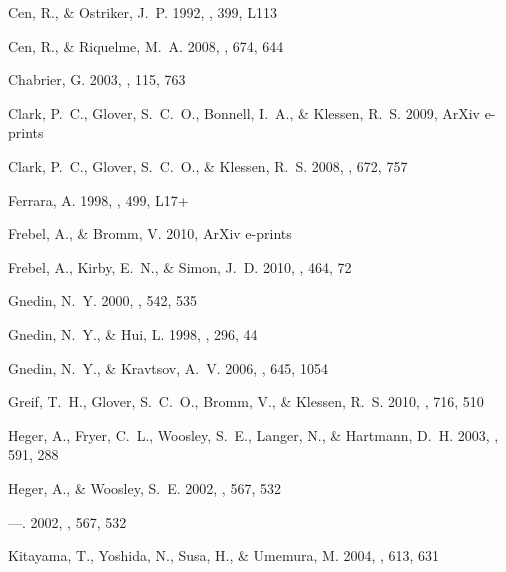 \documentclass[12pt,preprint]{aastex}
\begin{document}
\begin{thebibliography}{50}
{Cen}, R., \& {Ostriker}, J.~P. 1992, \apjl, 399, L113

{Cen}, R., \& {Riquelme}, M.~A. 2008, \apj, 674, 644

{Chabrier}, G. 2003, \pasp, 115, 763

{Clark}, P.~C., {Glover}, S.~C.~O., {Bonnell}, I.~A., \& {Klessen}, R.~S. 2009,
  ArXiv e-prints

{Clark}, P.~C., {Glover}, S.~C.~O., \& {Klessen}, R.~S. 2008, \apj, 672, 757

{Ferrara}, A. 1998, \apjl, 499, L17+

{Frebel}, A., \& {Bromm}, V. 2010, ArXiv e-prints

{Frebel}, A., {Kirby}, E.~N., \& {Simon}, J.~D. 2010, \nat, 464, 72

{Gnedin}, N.~Y. 2000, \apj, 542, 535

{Gnedin}, N.~Y., \& {Hui}, L. 1998, \mnras, 296, 44

{Gnedin}, N.~Y., \& {Kravtsov}, A.~V. 2006, \apj, 645, 1054

{Greif}, T.~H., {Glover}, S.~C.~O., {Bromm}, V., \& {Klessen}, R.~S. 2010,
  \apj, 716, 510

{Heger}, A., {Fryer}, C.~L., {Woosley}, S.~E., {Langer}, N., \& {Hartmann},
  D.~H. 2003, \apj, 591, 288

{Heger}, A., \& {Woosley}, S.~E. 2002{}, \apj, 567, 532

---. 2002{}, \apj, 567, 532

{Kitayama}, T., {Yoshida}, N., {Susa}, H., \& {Umemura}, M. 2004, \apj, 613,
  631


\end{thebibliography}
\end{document}
